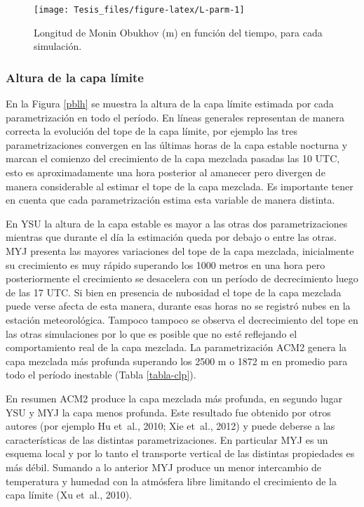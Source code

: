 \documentclass[12pt,spanish,oneside, a4paper]{book}
\begin{document}
\begin{figure}

{\centering \texttt{[image: Tesis\_files/figure-latex/L-parm-1]} 

}

\caption{Longitud de Monin Obukhov (m) en función del tiempo, para cada simulación. \label{L-param}}\label{fig:L-parm}
\end{figure}

\subsubsection{Altura de la capa
límite}\label{altura-de-la-capa-limite-1}

En la Figura \ref{pblh} se muestra la altura de la capa límite estimada
por cada parametrización en todo el período. En líneas generales
representan de manera correcta la evolución del tope de la capa límite,
por ejemplo las tres parametrizaciones convergen en las últimas horas de
la capa estable nocturna y marcan el comienzo del crecimiento de la capa
mezclada pasadas las 10 UTC, esto es aproximadamente una hora posterior
al amanecer pero divergen de manera considerable al estimar el tope de
la capa mezclada. Es importante tener en cuenta que cada parametrización
estima esta variable de manera distinta.

En YSU la altura de la capa estable es mayor a las otras dos
parametrizaciones mientras que durante el día la estimación queda por
debajo o entre las otras. MYJ presenta las mayores variaciones del tope
de la capa mezclada, inicialmente su crecimiento es muy rápido superando
los 1000 metros en una hora pero posteriormente el crecimiento se
desacelera con un período de decrecimiento luego de las 17 UTC. Si bien
en presencia de nubosidad el tope de la capa mezclada puede verse afecta
de esta manera, durante esas horas no se registró nubes en la estación
meteorológica. Tampoco tampoco se observa el decrecimiento del tope en
las otras simulaciones por lo que es posible que no esté reflejando el
comportamiento real de la capa mezclada. La parametrización ACM2 genera
la capa mezclada más profunda superando los 2500 m o 1872 m en promedio
para todo el período inestable (Tabla \ref{tabla-clp}).

En resumen ACM2 produce la capa mezclada más profunda, en segundo lugar
YSU y MYJ la capa menos profunda. Este resultado fue obtenido por otros
autores (por ejemplo Hu et~al., 2010; Xie et~al., 2012) y puede deberse
a las características de las distintas parametrizaciones. En particular
MYJ es un esquema local y por lo tanto el transporte vertical de las
distintas propiedades es más débil. Sumando a lo anterior MYJ produce un
menor intercambio de temperatura y humedad con la atmósfera libre
limitando el crecimiento de la capa límite (Xu et~al., 2010).
\end{document}
